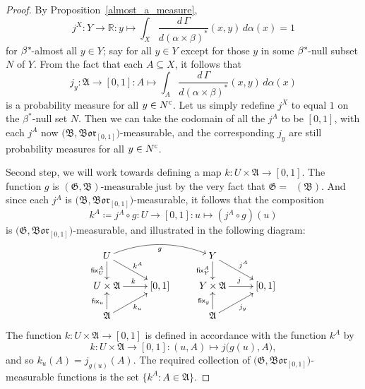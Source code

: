 \documentclass[
twoside=true,
paper=letter,
fontsize=9pt,
pagesize=auto,
leqno,
openany,
headsepline,
overfullrule,
]{scrbook}
\theoremstyle{plain}
\theoremstyle{plain}
\theoremstyle{definition}
\theoremstyle{bfnoteitalic}
\theoremstyle{bfnoteroman}
\newcommand{\sigalg}[1]{\mathfrak{#1}}
\newcommand{\definedby}{\coloneqq}
\newcommand{\sfop}[1]{\mathsf{#1}}
\newcommand{\borel}{\mathfrak{Bor}}
\newcommand{\comp}{^{\hbox{\tiny{$\mathsf C$}}}}
\newcommand{\preimage}[1]{\mathop{#1^{\leftarrow}}}
\newcommand{\R}{\mathbb{R}}
\newcommand{\sigmaalgebra}{\sigalg{A}}
\newcommand{\sigmaalgebraii}{\sigalg{B}}
\newcommand{\kernast}{\ast\kern-1pt}
\newcommand{\funcg}{g}
\newcommand{\funcj}{j}
\newcommand{\funck}{k}
\newcommand{\measurespace}{X}
\newcommand{\measurespaceii}{Y}
\newcommand{\mspaceelt}{x}
\newcommand{\mspaceeltii}{y}
\newcommand{\seti}{A}
\newcommand{\fixinthefirst}[1]{\sfop{fix}_{#1}}
\newcommand{\fixinthesecond}[1]{\sfop{fix}^{#1}}
\newcommand{\uspace}{U}%
\newcommand{\uspaceelt}{u}
\newcommand{\measonprod}{\Gamma}%
\newcommand{\marginalone}{\alpha}%
\newcommand{\marginaltwo}{\beta}%
\begin{document}
\begin{proof}
By Proposition~\ref{almost_a_measure},
\[
\funcj^\measurespace:
\measurespaceii\to\R:\mspaceeltii\mapsto
\int_\measurespace \dfrac{d\,\measonprod}{d(\marginalone\times\marginaltwo)^*}
(\mspaceelt,\mspaceeltii)
\,d\marginalone(\mspaceelt)
=
1
\]
for $\marginaltwo^\kernast$\hyp{}almost all  $\mspaceeltii\in\measurespaceii$; say for all
$\mspaceeltii\in\measurespaceii$ except for  those
$\mspaceeltii$ in some $\marginaltwo^\kernast$\hyp{}null subset $N$ of
$\measurespaceii$.
From the fact that each $\seti\subseteq\measurespace$, it follows that
\[
\funcj_\mspaceeltii :\sigmaalgebra \to [0,1]
: \seti \mapsto
\int_\seti
\dfrac{d\,\measonprod}{d(\marginalone\times\marginaltwo)^*}
(\mspaceelt,\mspaceeltii)\, d\marginalone(\mspaceelt)
\]
is a probability measure for all $\mspaceeltii\in N\comp$.
Let us simply redefine $\funcj^\measurespace$ to equal $1$ on the
$\marginaltwo^*$\hyp{}null
set $N$.  Then we can take the codomain of all the $\funcj^\seti$ to be $[0,1]$,
with each $\funcj^\seti$ now
$\bigl( \sigmaalgebraii, \borel_{[0,1]} \bigr)$\hyp{}measurable,
and the corresponding $\funcj_\mspaceeltii$ are still probability measures for all
$\mspaceeltii\in N\comp$.

Second step, we will work towards defining a map
$\funck: \uspace\times \sigmaalgebra \to [0,1]$.
The function $\funcg$ is
$(\sigalg{G},\sigmaalgebraii)$\hyp{}measurable just by the very fact that
$\sigalg{G} = \preimage{\funcg}(\sigmaalgebraii)$. And since each
$\funcj^\seti$ is
$\bigl( \sigmaalgebraii, \borel_{[0,1]} \bigr)$\hyp{}measurable, it follows that the composition
\[
\funck^\seti\definedby\funcj^\seti\circ\funcg
: \uspace \to [0,1]
:\uspaceelt \mapsto (\funcj^\seti\circ\funcg)(\uspaceelt)
\]
is
$\bigl( \sigalg{G}, \borel_{[0,1]} \bigr)$\hyp{}measurable, and illustrated in the following diagram:
\[%
\xymatrix@R=16pt@C=24pt{
\uspace \ar[d]_-{\fixinthesecond{\seti}_\uspace} \ar@/^12pt/[rr]_{\funcg}
\ar[dr]^{\funck^\seti}
&
& \measurespaceii \ar[d]_-{\fixinthesecond{\seti}_\measurespaceii}
\ar[dr]^{\funcj^\seti}
&
\\
\uspace\times\sigmaalgebra \ar[r]^{\funck}
& [0,1]
& \measurespaceii\times\sigmaalgebra \ar[r]^{\funcj}
& [0,1]
\\
\sigmaalgebra \ar[u]^{\fixinthefirst{\uspaceelt}}
\ar[ur]_{\funck_\uspaceelt}
&
& \sigmaalgebra \ar[u]^{\fixinthefirst{\mspaceeltii}}
\ar[ur]_{\funcj_\mspaceeltii}
&
\\
}
\]
The function
$\funck: \uspace\times \sigmaalgebra \to [0,1]$
is defined in accordance with the function $\funck^\seti$ by
\[
\funck: \uspace\times \sigmaalgebra \to [0,1] :
(\uspaceelt,\seti) \mapsto \funcj\bigl(\funcg(\uspaceelt),\seti\bigr),
\]
and so
$\funck_\uspaceelt(\seti)=\funcj_{\funcg(\uspaceelt)}(\seti)$.
The required collection of $\bigl( \sigalg{G}, \borel_{[0,1]} \bigr)$\hyp{}measurable
functions is the set $\{\funck^\seti : \seti\in\sigmaalgebra\}$.


\end{proof}
\end{document}
